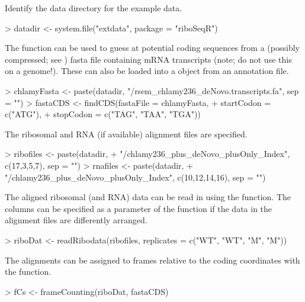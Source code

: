 \documentclass[a4paper]{article}
\begin{document}
Identify the data directory for the example data. 

\begin{Schunk}
\begin{Sinput}
> datadir <- system.file("extdata", package = "riboSeqR")
\end{Sinput}
\end{Schunk}

The  function can be used to guess at potential coding sequences from a (possibly compressed; see ) fasta file containing mRNA transcripts (note; do not use this on a genome!). These can also be loaded into a  object from an annotation file.

\begin{Schunk}
\begin{Sinput}
> chlamyFasta <- paste(datadir, "/rsem_chlamy236_deNovo.transcripts.fa", sep = "")
> fastaCDS <- findCDS(fastaFile = chlamyFasta, 
+                     startCodon = c("ATG"), 
+                     stopCodon = c("TAG", "TAA", "TGA"))
\end{Sinput}
\end{Schunk}

The ribosomal and RNA (if available) alignment files are specified.
\begin{Schunk}
\begin{Sinput}
> ribofiles <- paste(datadir, 
+                    "/chlamy236_plus_deNovo_plusOnly_Index", c(17,3,5,7), sep = "")
> rnafiles <- paste(datadir, 
+                   "/chlamy236_plus_deNovo_plusOnly_Index", c(10,12,14,16), sep = "")
\end{Sinput}
\end{Schunk}

The aligned ribosomal (and RNA) data can be read in using the  function. The columns can be specified as a parameter of the  function if the data in the alignment files are differently arranged.

\begin{Schunk}
\begin{Sinput}
> riboDat <- readRibodata(ribofiles, replicates = c("WT", "WT", "M", "M"))
\end{Sinput}
\end{Schunk}

The alignments can be assigned to frames relative to the coding coordinates with the  function.

\begin{Schunk}
\begin{Sinput}
> fCs <- frameCounting(riboDat, fastaCDS)
\end{Sinput}
\end{Schunk}
\end{document}
